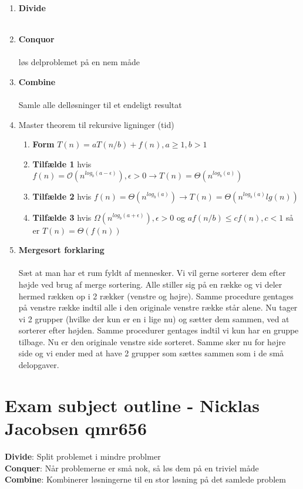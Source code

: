 \documentclass[12pt]{article}
\begin{document}
{\begin{enumerate}
\item \textbf{Divide} \\\\
\item \textbf{Conquor} \\\\løs delproblemet på en nem måde
\item \textbf{Combine} \\\\Samle alle delløsninger til et endeligt resultat 
\item Master theorem til rekursive ligninger (tid)
\begin{enumerate}
\item \textbf{Form} $T(n) = aT(n/b) + f(n), a \ge 1, b > 1$ 
\item \textbf{Tilfælde 1} hvis $f(n) = \mathcal{O}(n^{log_b(a-\epsilon)}), \epsilon > 0  \rightarrow T(n) = \Theta(n^{log_b(a)})$ 
\item \textbf{Tilfælde 2} hvis $f(n) = \Theta(n^{log_b(a)}) \rightarrow T(n) = \Theta(n^{log_b(a)}lg(n))$ 
\item \textbf{Tilfælde 3} hvis $\Omega (n^{log_b(a+\epsilon)}), \epsilon > 0$ og $af(n/b) \le cf(n), c < 1$ så er $T(n) = \Theta(f(n))$
\end{enumerate}
\item \textbf{Mergesort forklaring}\\\\ 
	Sæt at man har et rum fyldt af mennesker. Vi vil gerne sorterer dem efter højde ved brug af merge sortering. Alle stiller sig på en række og vi deler hermed rækken op i 2 rækker (venstre og højre).
	Samme procedure gentages på venstre række indtil alle i den originale venstre række står alene. Nu tager vi 2 grupper (hvilke der kun er en i lige nu) og sætter dem sammen, ved at sorterer efter højden.
	Samme procedurer gentages indtil vi kun har en gruppe tilbage. Nu er den originale venstre side sorteret. Samme sker nu for højre side og vi ender med at have 2 grupper som sættes sammen som i de små delopgaver.

\end{enumerate}
\newpage
\section*{Exam subject outline - Nicklas Jacobsen qmr656}
\textbf{Divide}: Split problemet i mindre problmer\\
\textbf{Conquer}: Når problemerne er små nok, så løs dem på en triviel måde\\
\textbf{Combine}: Kombinerer løsningerne til en stor løsning på det samlede problem
}
\end{document}
